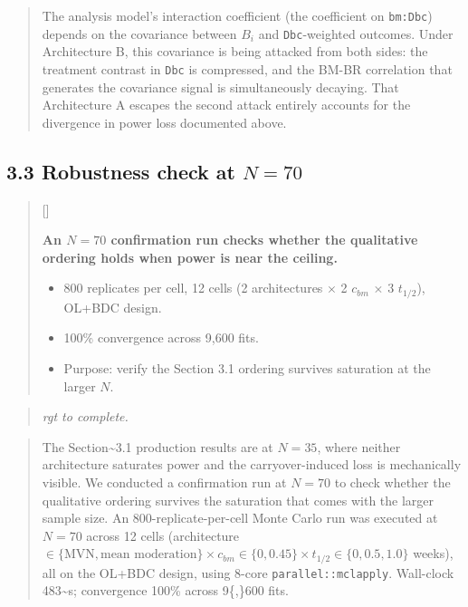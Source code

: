 \documentclass[
  11pt,
]{article}
\newcounter{pgraph}
\newenvironment{bullets}{%
  \stepcounter{pgraph}%
  \begin{quote}\small\sffamily\color[gray]{0.30}%
  {\normalfont\scriptsize\color[gray]{0.58}[\thepgraph]\enspace}}{%
  \end{quote}}
\newenvironment{rgt}{%
  \begin{quote}\small\itshape\color[RGB]{20,60,160}}{%
  \end{quote}}
\newenvironment{orig}{%
  \begin{quote}\normalsize\color[gray]{0.55}}{%
  \end{quote}}
\begin{document}
\begin{orig}
The analysis model's interaction coefficient (the coefficient on
\texttt{bm:Dbc}) depends on the covariance between \(B_i\) and
\texttt{Dbc}-weighted outcomes. Under Architecture B, this covariance is
being attacked from both sides: the treatment contrast in \texttt{Dbc}
is compressed, and the BM-BR correlation that generates the covariance
signal is simultaneously decaying. That Architecture A escapes the
second attack entirely accounts for the divergence in power loss
documented above.

\end{orig}

\subsection{3.3 Robustness check at $N = 70$}

\begin{bullets}

\textbf{An $N = 70$ confirmation run checks whether the
qualitative ordering holds when power is near the ceiling.}

\begin{itemize}\setlength{\itemsep}{2pt}\setlength{\parskip}{0pt}
\item 800 replicates per cell, 12 cells (2 architectures
  $\times$ 2 $c_{bm}$ $\times$ 3 $t_{1/2}$), OL+BDC design.
\item 100\% convergence across 9{,}600 fits.
\item Purpose: verify the Section 3.1 ordering survives
  saturation at the larger $N$.
\end{itemize}

\end{bullets}

\begin{rgt}
rgt to complete.

\end{rgt}

\begin{orig}
The Section\textasciitilde3.1 production results are at \(N = 35\),
where neither architecture saturates power and the carryover-induced
loss is mechanically visible. We conducted a confirmation run at
\(N = 70\) to check whether the qualitative ordering survives the
saturation that comes with the larger sample size. An
800-replicate-per-cell Monte Carlo run was executed at \(N = 70\) across
12 cells (architecture \(\in \{\text{MVN},
\text{mean moderation}\} \times c_{bm} \in \{0, 0.45\} \times
t_{1/2} \in \{0, 0.5, 1.0\}\) weeks), all on the OL+BDC design, using
8-core \texttt{parallel::mclapply}. Wall-clock 483\textasciitilde s;
convergence 100\% across 9\{,\}600 fits.

\end{orig}
\end{document}
